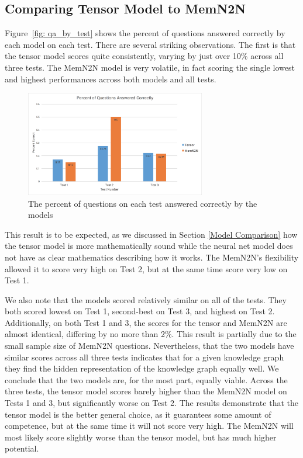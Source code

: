 \documentclass[pageno]{jpaper}
\begin{document}
\subsection{Comparing Tensor Model to MemN2N}
\label{Comparing Tensor Model to MemN2N}

Figure~\ref{fig: qa_by_test} shows the percent of questions answered correctly
by each model on each test. There are several striking observations. The first
is that the tensor model scores quite consistently, varying by just over 10\%
across all three tests. The MemN2N model is very volatile, in fact scoring the
single lowest and highest performances across both models and all tests.

\begin{figure}[!tb]
    \centering
    \includegraphics[width=0.7\textwidth,keepaspectratio]{figures/qa_by_test.png}
    \caption{The percent of questions on each test answered correctly by the models}
    \label{fig: qa_by_percent}
\end{figure}

This result is to be expected, as we discussed in Section \ref{Model Comparison}
how the tensor model is more mathematically sound while the neural net model
does not have as clear mathematics describing how it works. The MemN2N's
flexibility allowed it to score very high on Test 2, but at the same time score
very low on Test 1.

We also note that the models scored relatively similar on all of the tests. They
both scored lowest on Test 1, second-best on Test 3, and highest on Test 2.
Additionally, on both Test 1 and 3, the scores for the tensor and MemN2N are
almost identical, differing by no more than 2\%. This result is partially due to
the small sample size of MemN2N questions. Nevertheless, that the two models
have similar scores across all three tests indicates that for a given knowledge
graph they find the hidden representation of the knowledge graph equally well.
We conclude that the two models are, for the most part, equally viable. Across
the three tests, the tensor model scores barely higher than the MemN2N model on
Tests 1 and 3, but significantly worse on Test 2. The results demonstrate that
the tensor model is the better general choice, as it guarantees some amount of
competence, but at the same time it will not score very high. The MemN2N will
most likely score slightly worse than the tensor model, but has much higher
potential.
\end{document}
